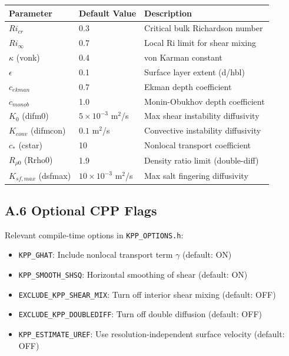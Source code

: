 \documentclass[11pt, a4paper]{article}
\begin{document}
\begin{center}
\begin{tabular}{lll}
\toprule
\textbf{Parameter} & \textbf{Default Value} & \textbf{Description} \\
\midrule
$Ri_{cr}$ & 0.3 & Critical bulk Richardson number \\
$Ri_\infty$ & 0.7 & Local Ri limit for shear mixing \\
$\kappa$ (vonk) & 0.4 & von Karman constant \\
$\epsilon$ & 0.1 & Surface layer extent (d/hbl) \\
$c_{ekman}$ & 0.7 & Ekman depth coefficient \\
$c_{monob}$ & 1.0 & Monin-Obukhov depth coefficient \\
$K_0$ (difm0) & $5 \times 10^{-3}$ m$^2$/s & Max shear instability diffusivity \\
$K_{conv}$ (difmcon) & $0.1$ m$^2$/s & Convective instability diffusivity \\
$c_*$ (cstar) & 10 & Nonlocal transport coefficient \\
$R_{\rho 0}$ (Rrho0) & 1.9 & Density ratio limit (double-diff) \\
$K_{sf,max}$ (dsfmax) & $10 \times 10^{-3}$ m$^2$/s & Max salt fingering diffusivity \\
\bottomrule
\end{tabular}
\end{center}

\subsection*{A.6 Optional CPP Flags}

Relevant compile-time options in \texttt{KPP\_OPTIONS.h}:

\begin{itemize}
    \item \texttt{KPP\_GHAT}: Include nonlocal transport term $\gamma$ (default: ON)
    \item \texttt{KPP\_SMOOTH\_SHSQ}: Horizontal smoothing of shear (default: ON)
    \item \texttt{EXCLUDE\_KPP\_SHEAR\_MIX}: Turn off interior shear mixing (default: OFF)
    \item \texttt{EXCLUDE\_KPP\_DOUBLEDIFF}: Turn off double diffusion (default: OFF)
    \item \texttt{KPP\_ESTIMATE\_UREF}: Use resolution-independent surface velocity (default: OFF)
\end{itemize}
\end{document}

